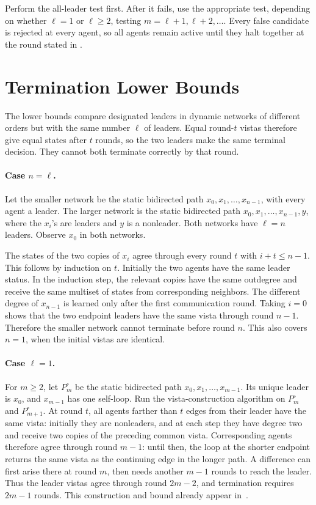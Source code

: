 \documentclass[11pt]{article}
\begin{document}
Perform the all-leader test first. After it fails, use the appropriate test, depending on whether \(\ell=1\) or \(\ell\geq2\),
testing \(m=\ell+1,\ell+2,\ldots\).
Every false candidate is rejected at every agent, so all agents
remain active until they halt together at the round stated in
.

\section{Termination Lower Bounds}
\label{app:termination-lower-bounds}

The lower bounds compare designated leaders in dynamic networks of different
orders but with the same number \(\ell\) of leaders. Equal round-\(t\)
vistas therefore give equal states after \(t\) rounds, so the
two leaders make the same terminal decision.  They cannot both terminate
correctly by that round.

\paragraph{Case \(n=\ell\).}
Let the smaller network be the static bidirected path
\(x_0,x_1,\ldots,x_{n-1}\), with every agent a leader.  The larger network
is the static bidirected path \(x_0,x_1,\ldots,x_{n-1},y\), where the
\(x_i\)'s are leaders and \(y\) is a nonleader. Both networks have
\(\ell=n\) leaders. Observe \(x_0\) in both networks.

The states of the two copies of \(x_i\) agree through every round \(t\) with
\(i+t\leq n-1\).  This follows by induction on \(t\).  Initially the two
agents have the same leader status.  In the induction step, the relevant
copies have the same outdegree and receive the same multiset of states from
corresponding neighbors.  The different degree of \(x_{n-1}\) is learned
only after the first communication round.  Taking \(i=0\) shows that the two
endpoint leaders have the same vista through round \(n-1\). Therefore the
smaller network cannot terminate before round \(n\). This
also covers \(n=1\), when the initial vistas are identical.

\paragraph{Case \(\ell=1\).}
For \(m\geq2\), let \(P_m^\circ\) be the static bidirected path
\(x_0,x_1,\ldots,x_{m-1}\).  Its unique leader is \(x_0\), and
\(x_{m-1}\) has one self-loop.
{Run the vista-construction algorithm on \(P_m^\circ\) and
\(P_{m+1}^\circ\).  At round \(t\), all agents farther than \(t\) edges from
their leader have the same vista: initially they are nonleaders, and at each
step they have degree two and receive two copies of the preceding common
vista.  Corresponding agents therefore agree through round \(m-1\): until
then, the loop at the shorter endpoint returns the same vista as the
continuing edge in the longer path.  A difference can first arise there at
round \(m\), then needs another \(m-1\) rounds to reach the leader.  Thus
the leader vistas agree through round \(2m-2\), and termination requires
\(2m-1\) rounds.}  This construction and bound already appear
in~\cite{DLV26}.
\end{document}
